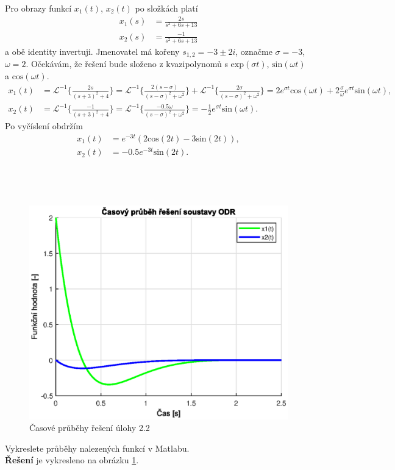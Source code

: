 \documentclass[twoside]{article}
\begin{document}
Pro obrazy funkcí $x_1(t)$, $x_2(t)$ po složkách platí
\begin{equation*}
	\begin{split}
		x_1(s) &= \frac{2s}{s^2 + 6s + 13} \\
		x_2(s) &= \frac{-1}{s^2 + 6s + 13}
	\end{split}
\end{equation*}
a obě identity invertuji. Jmenovatel má kořeny $s_{1,2} = -3 \pm 2i$, označme $\sigma = -3$, $\omega = 2$. Očekávám, že řešení bude složeno 
z kvazipolynomů s $\text{exp}(\sigma t)$, $\text{sin}(\omega t)$ a $\text{cos}(\omega t)$.
\begin{equation*}
	\begin{split}
		x_1(t) &= \mathcal{L}^{-1}\{\frac{2s}{(s+3)^2 + 4}\} = \mathcal{L}^{-1}\{\frac{2(s - \sigma)}{(s-\sigma)^2 + \omega^2}\} + \mathcal{L}^{-1}\{\frac{2\sigma}{(s-\sigma)^2 + \omega^2}\} = 
		2 e^{\sigma t} \text{cos}(\omega t) + 2 \frac{\sigma}{\omega} e^{\sigma t} \text{sin}(\omega t),\\
		x_2(t) &= \mathcal{L}^{-1}\{\frac{-1}{(s+3)^2 + 4}\} = \mathcal{L}^{-1}\{\frac{-0.5 \omega}{(s-\sigma)^2 + \omega^2}\} = -\frac{1}{2} e^{\sigma t} \text{sin}(\omega t).
	\end{split}
\end{equation*}
Po vyčíslení obdržím
\begin{equation*}
	\begin{split}
		x_1(t) &= e^{-3t}(2\text{cos}(2t) -3 \text{sin}(2t)), \\
		x_2(t) &= -0.5 e^{-3t}\text{sin}(2t).
	\end{split}
\end{equation*}

\subsection{~}
\begin{figure}[htbp]
	\includegraphics{solution22.eps}
	\caption{Časové průběhy řešení úlohy 2.2}
	\label{fig:reseni22}
\end{figure}
Vykreslete průběhy nalezených funkcí v Matlabu. \\
\textbf{Řešení} je vykresleno na obrázku \ref{fig:reseni22}.
\end{document}
